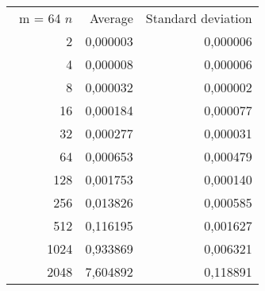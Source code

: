\begin{tabular}{rrr}\
m = 64
 $n$ & Average & Standard deviation  \\
2 &  0,000003 &  0,000006 \\ 
4 &  0,000008 &  0,000006 \\ 
8 &  0,000032 &  0,000002 \\ 
16 &  0,000184 &  0,000077 \\ 
32 &  0,000277 &  0,000031 \\ 
64 &  0,000653 &  0,000479 \\ 
128 &  0,001753 &  0,000140 \\ 
256 &  0,013826 &  0,000585 \\ 
512 &  0,116195 &  0,001627 \\ 
1024 &  0,933869 &  0,006321 \\ 
2048 &  7,604892 &  0,118891 \\ 
\end{tabular}

